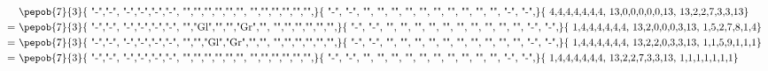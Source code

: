 \begin{equation}
    \begin{split}
        & \vcenter{ \hbox{ \pepob{7}{3}{{
                            "-","-", "-","-","-","-",
                            "","","","","","",
                            "","","","","","",}}{{
                            "-", "-",
                            "", "",
                            "", "",
                            "", "",
                            "", "",
                            "", "",
                            "-", "-",}}{{
                            4,4,4,4,4,4,4,
                            13,0,0,0,0,0,13,
                            13,2,2,7,3,3,13}} }}\\
        =&       \vcenter{ \hbox{ \pepob{7}{3}{{
                            "-","-", "-","-","-","-",
                            "","Gl","","","Gr","",
                            "","","","","","",}}{{
                            "-", "-",
                            "", "",
                            "", "",
                            "", "",
                            "", "",
                            "", "",
                            "-", "-",}}{{
                            1,4,4,4,4,4,4,
                            13,2,0,0,0,3,13,
                            1,5,2,7,8,1,4}}}} \\
        =&  \vcenter{ \hbox{ \pepob{7}{3}{{
                            "-","-", "-","-","-","-",
                            "","","Gl","Gr","","",
                            "","","","","","",}}{{
                            "-", "-",
                            "", "",
                            "", "",
                            "", "",
                            "", "",
                            "", "",
                            "-", "-",}}{{
                            1,4,4,4,4,4,4,
                            13,2,2,0,3,3,13,
                            1,1,5,9,1,1,1}} }}\\
        =& \vcenter{ \hbox{ \pepob{7}{3}{{
                            "-","-", "-","-","-","-",
                            "","","","","","",
                            "","","","","","",}}{{
                            "-", "-",
                            "", "",
                            "", "",
                            "", "",
                            "", "",
                            "", "",
                            "-", "-",}}{{
                            1,4,4,4,4,4,4,
                            13,2,2,7,3,3,13,
                            1,1,1,1,1,1,1}} }}
    \end{split}
\end{equation}

